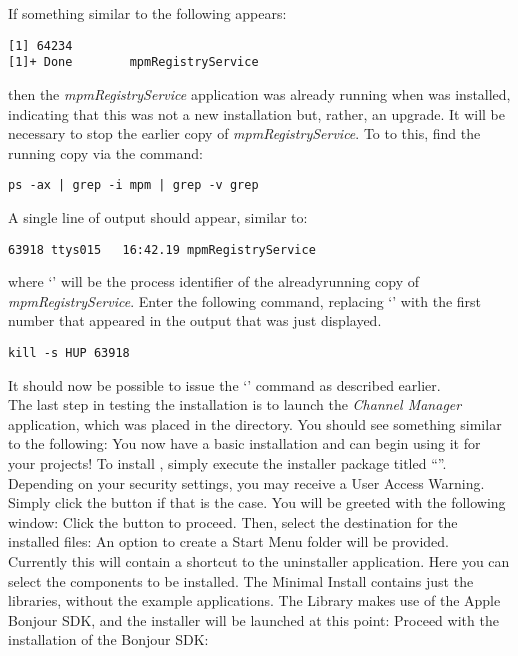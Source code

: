If something similar to the following appears:
\outputBegin
\begin{verbatim}
[1] 64234
[1]+ Done        mpmRegistryService
\end{verbatim}
\outputEnd{}
then the \emph{mpmRegistryService} application was already running when \mplusm{} was
installed, indicating that this was not a new installation but, rather, an upgrade.
\condPage{}
It will be necessary to stop the earlier copy of \emph{mpmRegistryService}.
To to this, find the running copy via the command:
\outputBegin
\begin{verbatim}
ps -ax | grep -i mpm | grep -v grep
\end{verbatim}
\outputEnd{}
A single line of output should appear, similar to:
\outputBegin
\begin{verbatim}
63918 ttys015   16:42.19 mpmRegistryService
\end{verbatim}
\outputEnd{}
where `' will be the process identifier of the already\longDash{}running
copy of \emph{mpmRegistryService}.
Enter the following command, replacing `' with the first number that
appeared in the output that was just displayed.
\outputBegin
\begin{verbatim}
kill -s HUP 63918
\end{verbatim}
\outputEnd{}
It should now be possible to issue the `' command as
described earlier.\\

The last step in testing the \mplusm{} installation is to launch the
\emph{Channel Manager} application, which was placed in the 
directory.
You should see something similar to the following:
You now have a basic \mplusm{} installation and can begin using it for your projects!
\tertiaryEnd
\secondaryEnd
\condPage
{}
To install \mplusm, simply execute the installer package titled
``''.
Depending on your security settings, you may receive a User Access Warning.
Simply click the  button if that is the case.
You will be greeted with the following window:
Click the  button to proceed.
\condPage{}
Then, select the destination for the installed files:
An option to create a Start Menu folder will be provided.
Currently this will contain a shortcut to the uninstaller application.
\condPage{}
Here you can select the components to be installed.
The Minimal Install contains just the libraries, without the example applications.
The \mplusm{} Library makes use of the Apple Bonjour SDK, and the installer will be
launched at this point:
\condPage{}
Proceed with the installation of the Bonjour SDK:


